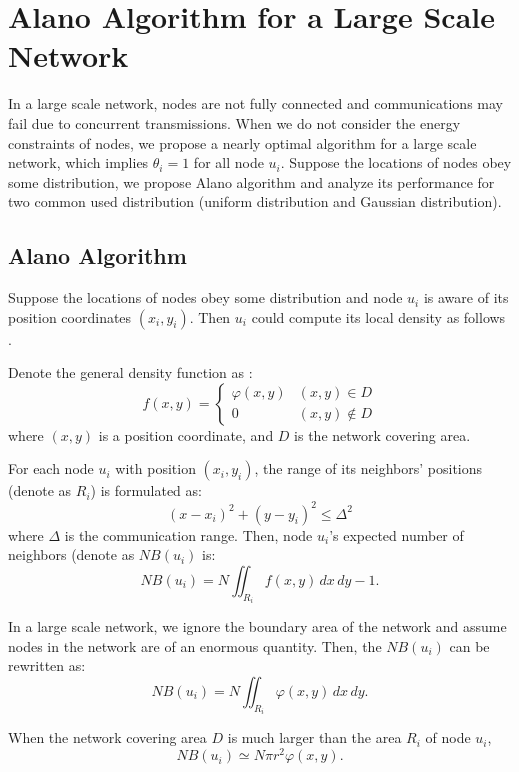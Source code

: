 \section{Alano Algorithm for a Large Scale Network}
\label{PCN}


In a large scale network, nodes are not fully connected and communications may fail due to concurrent transmissions. 
When we do not consider the energy constraints of nodes, we propose a nearly optimal algorithm for a large scale network, which implies $\theta_i = 1$ for all node $u_i$.
Suppose the locations of nodes obey some distribution, we propose Alano algorithm and analyze its performance for two common used distribution (uniform distribution and Gaussian distribution).

\subsection{Alano Algorithm}
Suppose the locations of nodes obey some distribution and node $u_i$ is aware of its position coordinates $(x_i, y_i)$.
Then $u_i$ could compute its local density as follows \cite{meester1996continuum, wang2015connectivity}.

Denote the general density function as :
$$f(x,y)=
\begin{cases}
\varphi(x,y)& (x,y)\in D\\
0& (x,y)\notin D
\end{cases}$$
where $(x,y)$ is a position coordinate, and $D$ is the network covering area.

For each node $u_i$ with position $(x_i,y_i)$, the range of its neighbors' positions (denote as $R_i$) is formulated as:
$$
(x-x_i)^2+(y-y_i)^2 \leq \Delta^2
$$
where $\Delta$ is the communication range. Then, node $u_i$'s expected number of neighbors (denote as $NB(u_i)$ is:
$$
NB(u_i) = N\iint_{R_i} f(x,y)\,dx\,dy - 1.
$$

In a large scale network, we ignore the boundary area of the network and assume nodes in the network are of an enormous quantity. Then, the $NB(u_i)$ can be rewritten as:
$$
NB(u_i) = N\iint_{R_i} \varphi(x,y)\,dx\,dy.
$$

When the network covering area $D$ is much larger than the area $R_i$ of node $u_i$, 
\begin{equation}
\label{eqnNB}
NB(u_i) \simeq N\pi r^2 \varphi(x,y).
\end{equation}


